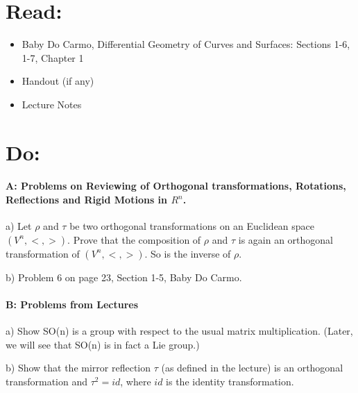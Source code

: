 \documentclass[12pt]{article}
\title{\rightline {\Huge {}}}
\author{\LARGE {HMC\quad Math 142 \quad Fall 2026} 
\\ {Prof. Gu}  
\\ {\LARGE Problem Set 3}}
\date{Start this assignment before Sunday night!}
\begin{document}
\maketitle

\section*{ Read: }

\begin{itemize}
	\item{Baby Do Carmo, Differential Geometry
		      of Curves and Surfaces:
		      Sections 1-6, 1-7, Chapter 1}
	\item{Handout (if any)}
	\item{Lecture Notes}
\end{itemize}

\section*{ Do: }
\paragraph{A: Problems on Reviewing of Orthogonal transformations,
	Rotations, Reflections and Rigid Motions
	in $R^n$.}
\begin{itemize}

	{\item a) Let $\rho$ and $\tau$ be two orthogonal transformations on
		an Euclidean space $(V^n, <,>)$.  Prove that the composition of
		$\rho$ and $\tau$ is again an orthogonal transformation of $(V^n,
			<,>)$.  So is the inverse of $\rho$.}

	{\item b) Problem 6 on page 23, Section 1-5, Baby Do Carmo.}
\end{itemize}

\medskip
\paragraph{B: Problems from Lectures}

\begin{itemize}
	{\item a) Show SO(n) is a group with respect to the usual matrix
		multiplication. (Later, we will see that SO(n) is in fact a Lie group.)}
	{\item b) Show that the mirror reflection $\tau$ (as defined in the
		lecture) is an orthogonal transformation and $\tau^2 = id$, where
		$id$ is the identity transformation. }
\end{itemize}
\end{document}
